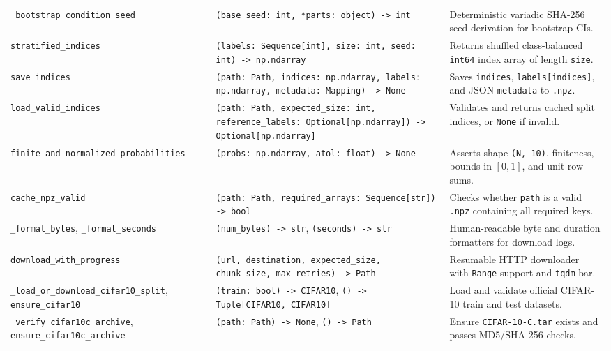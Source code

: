 \documentclass[11pt,a4paper]{article}
\begin{document}
{\begin{longtable}{P{0.30\textwidth} P{0.29\textwidth} P{0.34\textwidth}}
\texttt{\_\allowbreak{}bootstrap\_\allowbreak{}condition\_\allowbreak{}seed} & \texttt{(base\_\allowbreak{}seed: int, *parts: object) -> int} & Deterministic variadic SHA-256 seed derivation for bootstrap CIs. \\
\texttt{stratified\_\allowbreak{}indices} & \texttt{(labels: Sequence[int], size: int, seed: int) -> np.ndarray} & Returns shuffled class-balanced \texttt{int64} index array of length \texttt{size}. \\
\texttt{save\_\allowbreak{}indices} & \texttt{(path: Path, indices: np.ndarray, labels: np.ndarray, metadata: Mapping) -> None} & Saves \texttt{indices}, \texttt{labels[indices]}, and JSON \texttt{metadata} to \texttt{.npz}. \\
\texttt{load\_\allowbreak{}valid\_\allowbreak{}indices} & \texttt{(path: Path, expected\_\allowbreak{}size: int, reference\_\allowbreak{}labels: Optional[np.ndarray]) -> Optional[np.ndarray]} & Validates and returns cached split indices, or \texttt{None} if invalid. \\
\texttt{finite\_\allowbreak{}and\_\allowbreak{}normalized\_\allowbreak{}probabilities} & \texttt{(probs: np.ndarray, atol: float) -> None} & Asserts shape \texttt{(N, 10)}, finiteness, bounds in $[0, 1]$, and unit row sums. \\
\texttt{cache\_\allowbreak{}npz\_\allowbreak{}valid} & \texttt{(path: Path, required\_\allowbreak{}arrays: Sequence[str]) -> bool} & Checks whether \texttt{path} is a valid \texttt{.npz} containing all required keys. \\
\texttt{\_\allowbreak{}format\_\allowbreak{}bytes}, \texttt{\_\allowbreak{}format\_\allowbreak{}seconds} & \texttt{(num\_\allowbreak{}bytes) -> str}, \texttt{(seconds) -> str} & Human-readable byte and duration formatters for download logs. \\
\texttt{download\_\allowbreak{}with\_\allowbreak{}progress} & \texttt{(url, destination, expected\_\allowbreak{}size, chunk\_\allowbreak{}size, max\_\allowbreak{}retries) -> Path} & Resumable HTTP downloader with \texttt{Range} support and \texttt{tqdm} bar. \\
\texttt{\_\allowbreak{}load\_\allowbreak{}or\_\allowbreak{}download\_\allowbreak{}cifar10\_\allowbreak{}split}, \texttt{ensure\_\allowbreak{}cifar10} & \texttt{(train: bool) -> CIFAR10}, \texttt{() -> Tuple[CIFAR10, CIFAR10]} & Load and validate official CIFAR-10 train and test datasets. \\
\texttt{\_\allowbreak{}verify\_\allowbreak{}cifar10c\_\allowbreak{}archive}, \texttt{ensure\_\allowbreak{}cifar10c\_\allowbreak{}archive} & \texttt{(path: Path) -> None}, \texttt{() -> Path} & Ensure \texttt{CIFAR-10-C.tar} exists and passes MD5/SHA-256 checks. \\

\end{longtable}}
\end{document}
